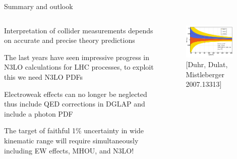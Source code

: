 \documentclass[aspectratio=169, 8pt,t]{beamer}
\begin{document}
\begin{frame}{Summary and outlook}

  \begin{columns}[T]
    \begin{column}{0.49\textwidth}
      \vspace*{1em}
      Interpretation of collider measurements depends on accurate and precise theory predictions
    
      \vspace*{1em}
      The last years have seen impressive progress in N3LO calculations for LHC processes, to exploit this we need N3LO PDFs
    
      \vspace*{1em}
      Electroweak effects can no longer be neglected thus include QED corrections in DGLAP and include a photon PDF
    
      \vspace*{1em}
      The target of faithful 1\% uncertainty in wide kinematic range will require simultaneously including EW effects, MHOU, and N3LO!    
    \end{column}
    \begin{column}{0.49\textwidth}
      \begin{figure}
        \includegraphics[width=0.9\textwidth]{figures/n3lomistlberger.png}
        \caption*{\color{gray}\small [Duhr, Dulat, Mistleberger 2007.13313]}
      \end{figure}
    \end{column}
  \end{columns}

  \vspace*{2em}
\end{frame}
\end{document}
